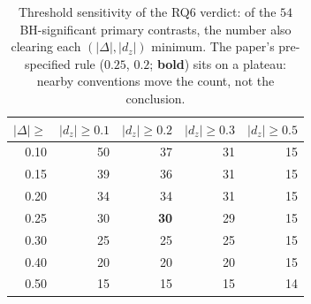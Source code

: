 \begin{table}[htbp]\centering\footnotesize
\caption{Threshold sensitivity of the RQ6 verdict: of the $54$ BH-significant primary contrasts, the number also clearing each $(|\Delta|, |d_z|)$ minimum. The paper's pre-specified rule ($0.25$, $0.2$; \textbf{bold}) sits on a plateau: nearby conventions move the count, not the conclusion.}
\label{tab:threshsens}
\begin{tabular}{@{}rrrrr@{}}
\toprule
$|\Delta|\geq$ & $|d_z|{\geq}0.1$ & $|d_z|{\geq}0.2$ & $|d_z|{\geq}0.3$ & $|d_z|{\geq}0.5$ \\ \midrule
0.10 & 50 & 37 & 31 & 15 \\
0.15 & 39 & 36 & 31 & 15 \\
0.20 & 34 & 34 & 31 & 15 \\
0.25 & 30 & \textbf{30} & 29 & 15 \\
0.30 & 25 & 25 & 25 & 15 \\
0.40 & 20 & 20 & 20 & 15 \\
0.50 & 15 & 15 & 15 & 14 \\
\bottomrule
\end{tabular}
\end{table}
